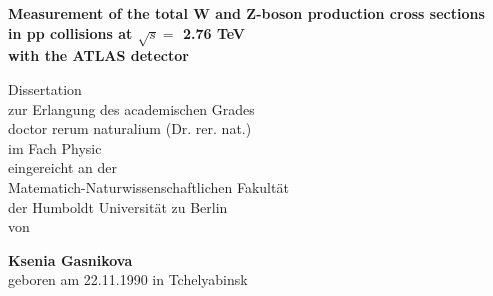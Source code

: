 
\begin{titlepage}
  \begin{center}
    \thispagestyle{empty}
    \vspace*{1cm}
    \begin{doublespace} 

      \textbf{\huge Measurement of the total W and Z-boson production cross sections}\\
      \textbf{\huge  in pp collisions at $\sqrt{s}=$ 2.76 TeV}\\
      \textbf{\huge with the ATLAS detector}\\
      \vskip2cm
	\begin{small}
	

        Dissertation\\
          zur Erlangung des academischen Grades\\
          doctor rerum naturalium (Dr. rer. nat.)\\
          im Fach Physic \\
          eingereicht an der \\
          Matematich-Naturwissenschaftlichen Fakultät \\
          der Humboldt Universität zu Berlin\\
          von\\
          
 	\end{small}
      \vskip2cm
      \begin{Large}
        
        \textbf{Ksenia Gasnikova}\\
        geboren am 22.11.1990 in Tchelyabinsk

       \end{Large}

       	\begin{small}
       	      \vskip2cm
        	\end{small}
    \end{doublespace} 
  \end{center}
\end{titlepage}


